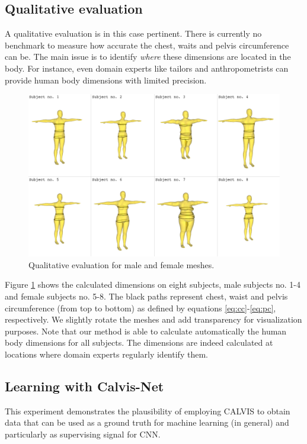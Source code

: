\documentclass[runningheads, orivec]{llncs}
\begin{document}
\subsection{Qualitative evaluation}\label{subsec:qualitative_eval}
A qualitative evaluation is in this case pertinent. There is currently no benchmark to measure how accurate the chest, waits and pelvis circumference can be. The main issue is to identify \textit{where} these dimensions are located in the body. For instance, even domain experts like tailors and anthropometrists can provide human body dimensions with limited precision.
\begin{figure}[H]
	\begin{center}
		\includegraphics[width=\linewidth]{experiment_1_results.png}
	\end{center}
	\caption{Qualitative evaluation for male and female meshes.}
	\label{fig:qualitative_eval}
\end{figure}

Figure \ref{fig:qualitative_eval} shows the calculated dimensions on eight 
subjects, male subjects no. 1-4 and female subjects no. 5-8. The black paths 
represent chest, waist and pelvis circumference (from 
top to bottom) as defined by equations \ref{eq:cc}-\ref{eq:pc}, respectively. 
We slightly rotate the meshes and add transparency for visualization purposes. 
Note that our method is able to calculate automatically the human body 
dimensions for all 
subjects. The dimensions are indeed calculated at locations where domain 
experts regularly identify them.

\subsection{Learning with Calvis-Net}\label{subsec:learning}
This experiment demonstrates the plausibility of employing CALVIS to obtain 
data 
that can be used as a ground truth for machine learning (in general) and particularly as supervising signal for CNN.
\end{document}

